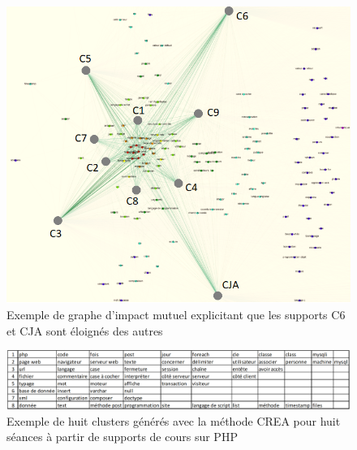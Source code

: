\begin{figure}[ht]
\centering
\centerline{  %
\includegraphics[scale=0.45]{3-Methode-CREA/images/0-fonctionnement-general/graphe-impact-mutuel.png}
}
\caption{Exemple de graphe d'impact mutuel explicitant que les supports C6 et CJA sont éloignés des autres}
\label{figure:3-MethodeGenerale-PII-output-graphe}
\end{figure}

\begin{figure}[ht]
\centering
\centerline{  %
\includegraphics[scale=0.65]{3-Methode-CREA/images/0-fonctionnement-general/8-clusters.png}
}
\caption{Exemple de huit clusters générés avec la méthode CREA pour huit séances à partir de supports de cours sur PHP}
\label{figure:3-MethodeGenerale-PII-output-clusters}
\end{figure}

